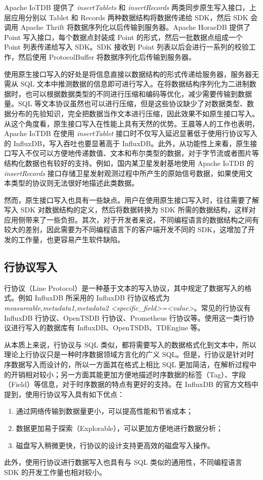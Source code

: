 Apache IoTDB 提供了 \emph{insertTablets} 和 \emph{insertRecords} 两类同步原生写入接口，上层应用分别以 Tablet 和 Records 两种数据结构将数据传递给 SDK，然后 SDK 会调用 Apache Thrift\cite{apache2024thrift} 将数据序列化以后传输到服务器。Apache HoraeDB 提供了 Point 写入接口，每个数据点封装成 Point 的形式，然后一批数据点组成一个 Point 列表传递给写入 SDK。SDK 接收到 Point 列表以后会进行一系列的校验工作，然后使用 ProtocolBuffer\cite{currier2022protocol} 将数据序列化后传输到服务器。

使用原生接口写入的好处是将信息直接以数据结构的形式传递给服务器，服务器无需从 SQL 文本中推测数据的信息即可进行写入。在将数据结构序列化为二进制数据时，也可以根据数据类型的不同进行压缩和编码等优化，减少需要传输到数据量。SQL 等文本协议虽然也可以进行压缩，但是这些协议缺少了对数据类型、数据分布的先验知识，完全把数据当作文本进行压缩，因此效果不如原生接口写入。从这个角度看，原生接口写入在性能上具有天然的优势。王晨等人的工作也表明，Apache IoTDB 在使用 \emph{insertTablet} 接口时不仅写入延迟显著低于使用行协议写入的 InfluxDB，写入吞吐也要显著高于 InfluxDB\cite{wang2023apache}。此外，从功能性上来看，原生接口写入不仅可以方便地传递数值、文本和布尔类型的数据，对于字节流或者图片等结构化数据也有较好的支持。例如，国内某卫星发射基地使用 Apache IoTDB 的 \emph{insertRecords} 接口存储卫星发射观测过程中所产生的原始信号数据，如果使用文本类型的协议则无法很好地描述此类数据。

然而，原生接口写入也具有一些缺点。用户在使用原生接口写入时，往往需要了解写入 SDK 对数据结构的定义，然后将数据转换为 SDK 所需的数据结构，这样对应用侧带来了一些负担。其次，对于开发者来说，不同编程语言的数据结构之间有较大的差别，因此需要为不同编程语言下的客户端开发不同的 SDK，这增加了开发的工作量，也更容易产生软件缺陷。

\subsection{行协议写入}
行协议（Line Protocol）\cite{influx2024lineprotocol}是一种基于文本的写入协议，其中规定了数据写入的格式。例如 InfluxDB 所采用的 InfluxDB 行协议格式为\emph{measureable,metadata1,metadata2 <specific\_field>=<value>}。常见的行协议有 InfluxDB 行协议、OpenTSDB 行协议、Prometheus 行协议等。使用这一类行协议进行写入的数据库有 InfluxDB、OpenTSDB、TDEngine 等。

从本质上来说，行协议与 SQL 类似，都将需要写入的数据格式化到文本中，所以理论上行协议只是一种时序数据领域方言化的广义 SQL。但是，行协议是针对时序数据写入而设计的，所以一方面其在格式上相比 SQL 更加简洁，在解析过程中的开销相对较小；另一方面其能更加方便地描述时序数据的标签（Tag）、字段（Field）等信息，对于时序数据的特点有更好的支持。在 InfluxDB 的官方文档中提到，使用行协议写入具有如下优点：
\begin{enumerate}
  \item 通过网络传输到数据量更小，可以提高性能和节省成本；
  \item 数据更加易于探索（Explorable），可以更加方便地进行数据分析；
  \item 磁盘写入稍微更快，行协议的设计支持更高效的磁盘写入操作。
\end{enumerate}
此外，使用行协议进行数据写入也具有与 SQL 类似的通用性，不同编程语言 SDK 的开发工作量也相对较小。

